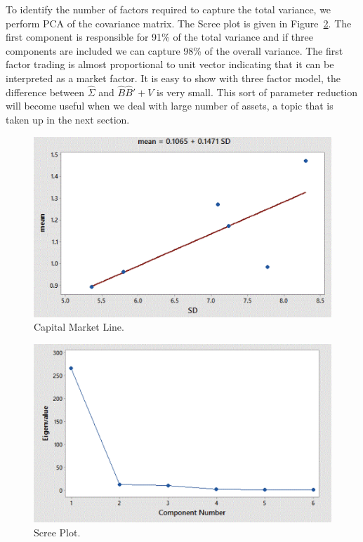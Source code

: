To identify the number of factors required to capture the total variance, we perform PCA of the covariance matrix. The Scree plot is given in Figure~\ref{fig:screeplot}. The first component is responsible for 91\% of the total variance and if three components are included we can capture 98\% of the overall variance. The first factor trading is almost proportional to unit vector indicating that it can be interpreted as a market factor. It is easy to show with three factor model, the difference between $\hat{\Sigma}$ and $\hat{B}\hat{B}'+V$ is very small. This sort of parameter reduction will become useful when we deal with large number of assets, a topic that is taken up in the next section. 


\begin{figure}[!ht]
   \centering
   \includegraphics[width=\textwidth]{chapters/chapter_apm/figures/capmarket.png} 
   \caption{Capital Market Line.\label{fig:capmarket}}
\end{figure}


\begin{figure}[!ht]
   \centering
   \includegraphics[width=\textwidth]{chapters/chapter_apm/figures/scree.png} 
   \caption{Scree Plot.\label{fig:screeplot}}
\end{figure}
	
